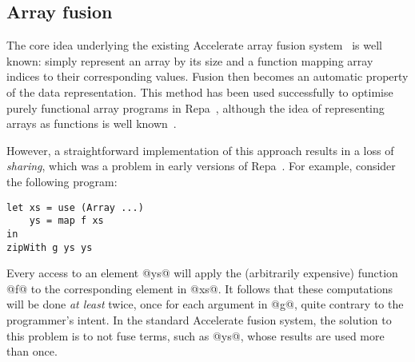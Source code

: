 \subsection{Array fusion}

The core idea underlying the existing Accelerate array fusion
system~\cite{McDonell:acc-optim} is well known: simply represent an array by its
size and a function mapping array indices to their corresponding values. Fusion
then becomes an automatic property of the data representation. This method has
been used successfully to optimise purely functional array programs in
Repa~\cite{Keller:Repa,Lippmeier:Guiding}, although the idea of representing
arrays as functions is well known~\cite{Claessen:obsidian-expressive,Guibas:1978jh,Elliott:2003ug}.



However, a straightforward implementation of this approach results in a loss of
\emph{sharing}, which was a problem in early versions of
Repa~\cite{Lippmeier:Guiding}. For example, consider the following program:
%
\begin{lstlisting}
let xs = use (Array ...)
    ys = map f xs
in
zipWith g ys ys
\end{lstlisting}
%
Every access to an element @ys@ will apply the (arbitrarily expensive) function @f@
to the corresponding element in @xs@. It follows that these computations will be
done \emph{at least} twice, once for each argument in @g@, quite contrary to the
programmer's intent. In the standard Accelerate fusion system, the solution to
this problem is to not fuse terms, such as @ys@, whose results are used more than
once.


